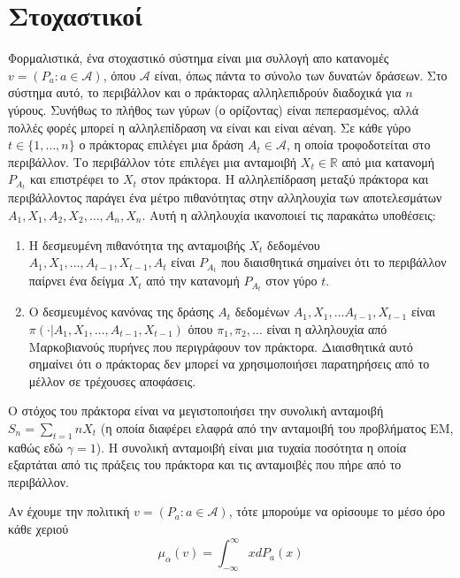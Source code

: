 \section{Στοχαστικοί }

Φορμαλιστικά, ένα στοχαστικό σύστημα  είναι μια συλλογή απο κατανομές $v = (P_a : a \in \mathcal{A})$,
όπου $\mathcal{A}$ είναι, όπως πάντα το σύνολο των δυνατών δράσεων. Στο σύστημα αυτό, το περιβάλλον και ο πράκτορας αλληλεπιδρούν διαδοχικά για $n$ γύρους.
Συνήθως το πλήθος των γύρων (ο ορίζοντας) είναι πεπερασμένος, αλλά πολλές φορές μπορεί η αλληλεπίδραση να είναι και είναι αέναη.
Σε κάθε γύρο $t \in \{1, \ldots, n\}$ ο πράκτορας επιλέγει μια δράση $A_t \in \mathcal{A}$, η οποία τροφοδοτείται στο περιβάλλον.
Το περιβάλλον τότε επιλέγει μια ανταμοιβή $X_t \in \mathbb{R}$ από μια κατανομή $P_{A_t}$ και επιστρέφει το $X_t$ στον πράκτορα. Η αλληλεπίδραση
μεταξύ πράκτορα και περιβάλλοντος παράγει ένα μέτρο πιθανότητας στην αλληλουχία των αποτελεσμάτων $A_1, X_1, A_2, X_2, \ldots, A_n, X_n$.
Αυτή η αλληλουχία ικανοποιεί τις παρακάτω υποθέσεις:

\begin{enumerate}
    \item Η δεσμευμένη πιθανότητα της ανταμοιβής $X_t$ δεδομένου $A_1, X_1, \ldots, A_{t-1}, X_{t-1}, A_t$ είναι $P_{A_t}$ που διαισθητικά σημαίνει ότι το περιβάλλον παίρνει ένα δείγμα $X_t$ από την κατανομή $P_{A_t}$ στον γύρο $t$.
    \item Ο δεσμευμένος κανόνας της δράσης $A_t$ δεδομένων $A_1, X_1, \ldots A_{t-1}, X_{t-1}$ είναι \\$π(\cdot|A_1,X_1, \ldots,A_{t-1},X_{t-1})$ όπου $π_1, π_2, \ldots$ είναι η αλληλουχία από Μαρκοβιανούς πυρήνες που περιγράφουν τον πράκτορα. Διαισθητικά αυτό σημαίνει ότι ο πράκτορας δεν μπορεί να χρησιμοποιήσει παρατηρήσεις από το μέλλον σε τρέχουσες αποφάσεις.
\end{enumerate}

Ο στόχος του πράκτορα είναι να μεγιστοποιήσει την συνολική ανταμοιβή $S_n = \sum_{t=1}{n}X_t$ (η οποία διαφέρει ελαφρά από την ανταμοιβή του προβλήματος ΕΜ, καθώς εδώ $γ=1$). Η συνολική ανταμοιβή είναι μια τυχαία ποσότητα η οποία εξαρτάται από τις πράξεις του πράκτορα και τις ανταμοιβές που πήρε από το περιβάλλον.

Αν έχουμε την πολιτική $v = (P_a : a \in \mathcal{A})$, τότε μπορούμε να ορίσουμε το μέσο όρο κάθε χεριού
\begin{equation*}
    μ_α(v) = \int_{-\infty}^{\infty}xdP_a(x)
\end{equation*}

